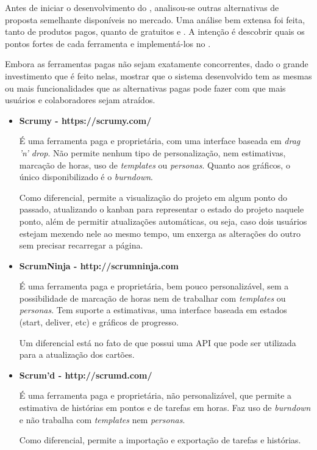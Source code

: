 Antes de iniciar o desenvolvimento do \calopsita{}, analisou-se outras alternativas de proposta semelhante disponíveis no mercado. Uma análise bem extensa foi feita, tanto de produtos pagos, quanto de gratuitos e \opensource{}. A intenção é descobrir quais os pontos fortes de cada ferramenta e implementá-los no \calopsita{}. 

Embora as ferramentas pagas não sejam exatamente concorrentes, dado o grande investimento que é feito nelas, mostrar que o sistema desenvolvido tem as mesmas ou mais funcionalidades que as alternativas pagas pode fazer com que mais usuários e colaboradores sejam atraídos.

\begin{itemize}
\item{\textbf{Scrumy - https://scrumy.com/}

É uma ferramenta paga e proprietária, com uma interface baseada em \textit{drag 'n' drop}. Não permite nenhum tipo de personalização, nem estimativas, marcação de horas, uso de \textit{templates} ou \textit{personas}. Quanto aos gráficos, o único disponibilizado é o \textit{burndown}. 

Como diferencial, permite a visualização do projeto em algum ponto do passado, atualizando o kanban para representar o estado do projeto naquele ponto, além de permitir atualizações automáticas, ou seja, caso dois usuários estejam mexendo nele ao mesmo tempo, um enxerga as alterações do outro sem precisar recarregar a página.}

\item{\textbf{ScrumNinja - http://scrumninja.com}

É uma ferramenta paga e proprietária, bem pouco personalizável, sem a possibilidade de marcação de horas nem de trabalhar com \textit{templates} ou \textit{personas}. Tem suporte a estimativas, uma interface baseada em estados (start, deliver, etc) e gráficos de progresso. 

Um diferencial está no fato de que possui uma API que pode ser utilizada para a atualização dos cartões.}

\item{\textbf{Scrum'd - http://scrumd.com/}

É uma ferramenta paga e proprietária, não personalizável, que permite a estimativa de histórias em pontos e de tarefas em horas. Faz uso de \textit{burndown} e não trabalha com \textit{templates} nem \textit{personas}. 

Como diferencial, permite a importação e exportação de tarefas e histórias.}


\end{itemize}
